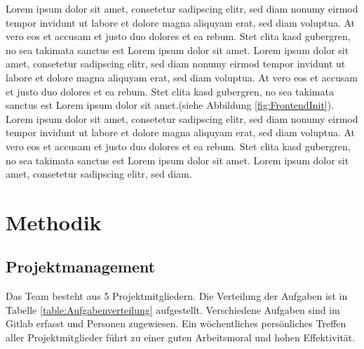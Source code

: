 \documentclass[a4paper]{spie}  %
\begin{document}
Lorem ipsum dolor sit amet, consetetur sadipscing elitr, sed diam nonumy eirmod tempor invidunt ut labore et dolore magna aliquyam erat, sed diam voluptua. At vero eos et accusam et justo duo dolores et ea rebum. Stet clita kasd gubergren, no sea takimata sanctus est Lorem ipsum dolor sit amet. Lorem ipsum dolor sit amet, consetetur sadipscing elitr, sed diam nonumy eirmod tempor invidunt ut labore et dolore magna aliquyam erat, sed diam voluptua. At vero eos et accusam et justo duo dolores et ea rebum. Stet clita kasd gubergren, no sea takimata sanctus est Lorem ipsum dolor sit amet.(siehe Abbildung \ref{fig:FrontendInit}).
\\
Lorem ipsum dolor sit amet, consetetur sadipscing elitr, sed diam nonumy eirmod tempor invidunt ut labore et dolore magna aliquyam erat, sed diam voluptua. At vero eos et accusam et justo duo dolores et ea rebum. Stet clita kasd gubergren, no sea takimata sanctus est Lorem ipsum dolor sit amet. Lorem ipsum dolor sit amet, consetetur sadipscing elitr, sed diam.

\section{Methodik} %
\subsection{Projektmanagement}
Das Team besteht aus 5 Projektmitgliedern. Die Verteilung der Aufgaben ist in Tabelle \ref{table:Aufgabenverteilung} aufgestellt.
Verschiedene Aufgaben sind im Gitlab erfasst und Personen zugewiesen. Ein wöchentliches persönliches Treffen aller Projektmitglieder führt zu einer guten Arbeitsmoral und hohen Effektivität.
\end{document}
